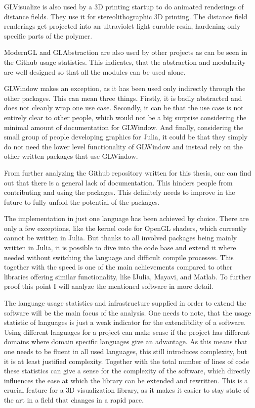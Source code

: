 GLVisualize is also used by a 3D printing startup\cite{AddSub} to do animated renderings of distance fields.
They use it for stereolithographic 3D printing. 
The distance field renderings get projected into an ultraviolet light curable resin, hardening only specific parts of the polymer.

ModernGL and GLAbstraction are also used by other projects as can be seen in the Github usage statistics.
This indicates, that the abstraction and modularity are well designed so that all the modules can be used alone.

GLWindow makes an exception, as it has been used only indirectly through the other packages. 
This can mean three things.
Firstly, it is badly abstracted and does not cleanly wrap one use case.
Secondly, it can be that the use case is not entirely clear to other people, which would not be a big surprise considering the minimal amount of documentation for GLWindow.
And finally, considering the small group of people developing graphics for Julia, it could be that they simply do not need the lower level functionality of GLWindow and instead rely on the other written packages that use GLWindow.

From further analyzing the Github repository written for this thesis, one can find out that there is a general lack of documentation.
This hinders people from contributing and using the packages. This definitely needs to improve in the future to fully unfold the potential of the packages.

The implementation in just one language has been achieved by choice. 
There are only a few exceptions, like the kernel code for OpenGL shaders, which currently cannot be written in Julia.
But thanks to all involved packages being mainly written in Julia, it is possible to dive into the code base and extend it where needed without switching the language and difficult compile processes.
This together with the speed is one of the main achievements compared to other libraries offering similar functionality, like IJulia, Mayavi, and Matlab.
To further proof this point I will analyze the mentioned software in more detail.

The language usage statistics and infrastructure supplied in order to extend the software will be the main focus of the analysis.
One needs to note, that the usage statistic of languages is just a weak indicator for the extendibility of a software.
Using different languages for a project can make sense if the project has different domains where domain specific languages give an advantage. 
As this means that one needs to be fluent in all used languages, this still introduces complexity, but it is at least justified complexity.
Together with the total number of lines of code these statistics can give a sense for the complexity of the software, which directly influences the ease at which the library can be extended and rewritten.
This is a crucial feature for a 3D visualization library, as it makes it easier to stay state of the art in a field that changes in a rapid pace.

